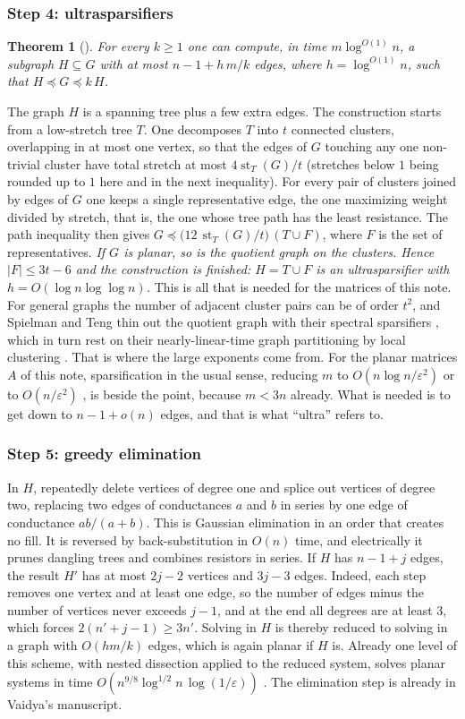 \documentclass[11pt]{amsart}
\newtheorem{theorem}{Theorem}[section]
\theoremstyle{definition}
\theoremstyle{remark}
\newcommand{\st}{\operatorname{st}}
\newcommand{\lo}{\preccurlyeq}
\newcommand{\eps}{\varepsilon}
\begin{document}
\subsubsection*{Step 4: ultrasparsifiers}
\begin{theorem}[\cite{STsolve}]\label{thm:ultra}
For every $k\ge1$ one can compute, in time $m\log^{O(1)}n$, a subgraph $H\subseteq G$ with at most $n-1+h\,m/k$ edges, where $h=\log^{O(1)}n$, such that $H\lo G\lo k\,H$.
\end{theorem}
The graph $H$ is a spanning tree plus a few extra edges. The construction starts from a low-stretch tree $T$. One decomposes $T$ into $t$ connected clusters, overlapping in at most one vertex,
so that the edges of $G$ touching any one non-trivial cluster have total stretch at most $4\st_T(G)/t$ (stretches below $1$ being rounded up to $1$ here and in the next inequality). For every pair of clusters joined by edges of $G$ one keeps a single representative edge, the one maximizing weight divided by stretch, that is, the one whose tree path has the least resistance.
The path inequality then gives $G\lo\bigl(12\,\st_T(G)/t\bigr)\,(T\cup F)$, where $F$ is the set of representatives. \emph{If $G$ is planar, so is the quotient graph on the clusters. Hence $|F|\le3t-6$ and the construction is finished:
$H=T\cup F$ is an ultrasparsifier with $h=O(\log n\log\log n)$.} This is all that is needed for the matrices of this note. For general graphs the number of adjacent cluster pairs can be of order $t^2$, and Spielman and Teng thin out
the quotient graph with their spectral sparsifiers \cite{STspars}, which in turn rest on their nearly-linear-time graph partitioning by local clustering \cite{STcluster}. That is where the large exponents come from.
For the planar matrices $A$ of this note, sparsification in the usual sense, reducing $m$ to $O(n\log n/\eps^2)$ \cite{SS11} or to $O(n/\eps^2)$ \cite{BSS12}, is beside the point, because $m<3n$ already.
What is needed is to get down to $n-1+o(n)$ edges, and that is what ``ultra'' refers to.

\subsubsection*{Step 5: greedy elimination}
In $H$, repeatedly delete vertices of degree one and splice out vertices of degree two, replacing two edges of conductances $a$ and $b$ in series by one edge of conductance $ab/(a+b)$.
This is Gaussian elimination in an order that creates no fill. It is reversed by back-substitution in $O(n)$ time, and electrically it prunes dangling trees and combines resistors in series.
If $H$ has $n-1+j$ edges, the result $H'$ has at most $2j-2$ vertices and $3j-3$ edges. Indeed, each step removes one vertex and at least one edge, so the number of edges minus the number of vertices never exceeds $j-1$, and at the end all degrees are at least $3$, which forces $2(n'+j-1)\ge3n'$.
Solving in $H$ is thereby reduced to solving in a graph with $O(hm/k)$ edges, which is again planar if $H$ is.
Already one level of this scheme, with nested dissection applied to the reduced system, solves planar systems in time $O(n^{9/8}\log^{1/2}n\,\log(1/\eps))$ \cite[Theorem~4.3]{STsolve}.
The elimination step is already in Vaidya's manuscript.
\end{document}
